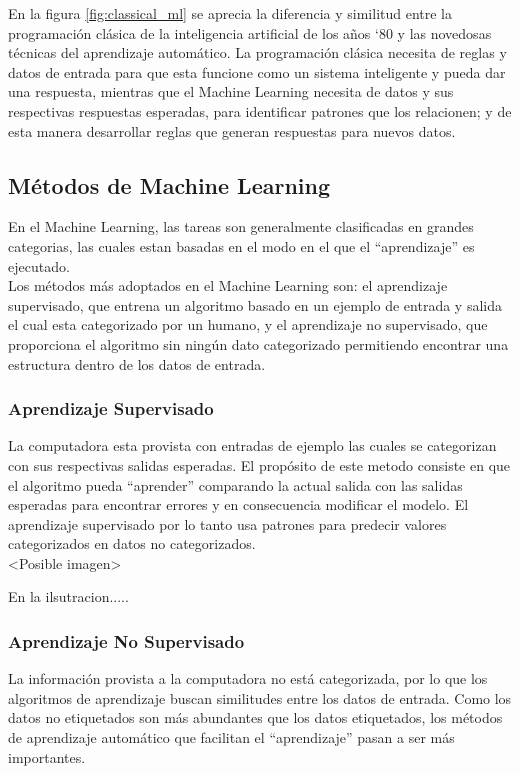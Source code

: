 En la figura \ref{fig:classical_ml} se aprecia la diferencia y similitud entre la programación clásica de la inteligencia artificial de los años `80 y las novedosas técnicas del aprendizaje automático. La programación clásica necesita de reglas y datos de entrada para que esta funcione como un sistema inteligente y pueda dar una respuesta, mientras que el Machine Learning necesita de datos y sus respectivas respuestas esperadas, para identificar patrones que los relacionen; y de esta manera  desarrollar reglas que generan respuestas para nuevos datos.

\subsection{Métodos de Machine Learning}
En el Machine Learning, las tareas son generalmente clasificadas en grandes categorias, las cuales estan basadas en el modo en el que el ``aprendizaje'' es ejecutado.\\

Los métodos más adoptados en el Machine Learning son: el aprendizaje supervisado, que entrena un algoritmo basado en un ejemplo de entrada y salida el cual esta categorizado por un humano, y el aprendizaje no supervisado, que proporciona el algoritmo sin ningún dato categorizado permitiendo encontrar una estructura dentro de los datos de entrada.\

\subsubsection{Aprendizaje Supervisado}
La computadora esta provista con entradas de ejemplo las cuales se categorizan con sus respectivas salidas esperadas. El propósito de este metodo consiste en que el algoritmo pueda  ``aprender'' comparando la actual salida con las salidas esperadas para encontrar errores y en consecuencia modificar el modelo. El aprendizaje supervisado por lo tanto usa patrones para predecir valores categorizados en datos no categorizados.\\
<Posible imagen>

En la ilsutracion.....

\subsubsection{Aprendizaje No Supervisado}
La información provista a la computadora no está categorizada, por lo que los algoritmos de aprendizaje buscan similitudes entre los datos de entrada. Como los datos no etiquetados son más abundantes que los datos etiquetados, los métodos de aprendizaje automático que facilitan el ``aprendizaje'' pasan a ser más importantes.\

